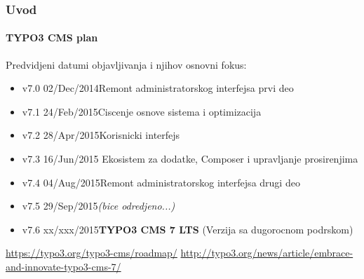 \begin{frame}[fragile]
	\frametitle{Uvod}
	\framesubtitle{TYPO3 CMS plan}

	Predvidjeni datumi objavljivanja i njihov osnovni fokus:

	\begin{itemize}
		\item v7.0 \tabto{1.0cm}02/Dec/2014\tabto{3.4cm}Remont administratorskog interfejsa prvi deo
		\item v7.1 \tabto{1.0cm}24/Feb/2015\tabto{3.4cm}Ciscenje osnove sistema i optimizacija
		\item v7.2 \tabto{1.0cm}28/Apr/2015\tabto{3.4cm}Korisnicki interfejs

		\item
			\begingroup
				\color{typo3orange}
					v7.3 \tabto{1.0cm}16/Jun/2015\tabto{3.4cm} Ekosistem za dodatke, Composer\newline
					\tabto{3.4cm} i upravljanje prosirenjima
			\endgroup

		\item v7.4 \tabto{1.0cm}04/Aug/2015\tabto{3.4cm}Remont administratorskog interfejsa drugi deo
		\item v7.5 \tabto{1.0cm}29/Sep/2015\tabto{3.4cm}\textit{(bice odredjeno...)}
		\item v7.6 \tabto{1.0cm}xx/xxx/2015\tabto{3.4cm}\textbf{TYPO3 CMS 7 LTS}\newline
			\tabto{3.4cm}(Verzija sa dugorocnom podrskom)
	\end{itemize}

	\smaller
		\url{https://typo3.org/typo3-cms/roadmap/}\newline
		\url{http://typo3.org/news/article/embrace-and-innovate-typo3-cms-7/}
	\normalsize

\end{frame}

